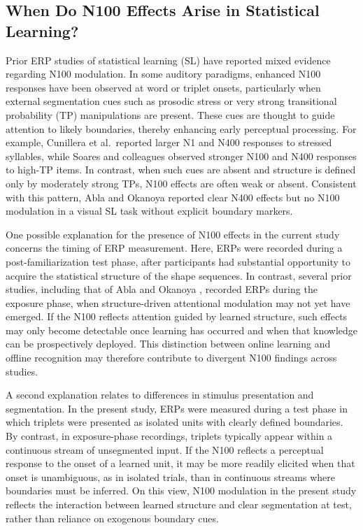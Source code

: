 \subsection*{When Do N100 Effects Arise in Statistical Learning?}

Prior ERP studies of statistical learning (SL) have reported mixed evidence regarding N100 modulation. In some auditory paradigms, enhanced N100 responses have been observed at word or triplet onsets, particularly when external segmentation cues such as prosodic stress \cite{cunilleraEffectsStressStatistical2006, sandersERPStudyContinuous2003} or very strong transitional probability (TP) manipulations \cite{soaresNotAllWords2020, soaresLearningWordsListening2022} are present. These cues are thought to guide attention to likely boundaries, thereby enhancing early perceptual processing. For example, Cunillera et al.\ reported larger N1 and N400 responses to stressed syllables, while Soares and colleagues observed stronger N100 and N400 responses to high-TP items. In contrast, when such cues are absent and structure is defined only by moderately strong TPs, N100 effects are often weak or absent. Consistent with this pattern, Abla and Okanoya \cite{ablaVisualStatisticalLearning2009} reported clear N400 effects but no N100 modulation in a visual SL task without explicit boundary markers.

One possible explanation for the presence of N100 effects in the current study concerns the timing of ERP measurement. Here, ERPs were recorded during a post-familiarization test phase, after participants had substantial opportunity to acquire the statistical structure of the shape sequences. In contrast, several prior studies, including that of Abla and Okanoya \cite{ablaVisualStatisticalLearning2009}, recorded ERPs during the exposure phase, when structure-driven attentional modulation may not yet have emerged. If the N100 reflects attention guided by learned structure, such effects may only become detectable once learning has occurred and when that knowledge can be prospectively deployed. This distinction between online learning and offline recognition may therefore contribute to divergent N100 findings across studies.

A second explanation relates to differences in stimulus presentation and segmentation. In the present study, ERPs were measured during a test phase in which triplets were presented as isolated units with clearly defined boundaries. By contrast, in exposure-phase recordings, triplets typically appear within a continuous stream of unsegmented input. If the N100 reflects a perceptual response to the onset of a learned unit, it may be more readily elicited when that onset is unambiguous, as in isolated trials, than in continuous streams where boundaries must be inferred. On this view, N100 modulation in the present study reflects the interaction between learned structure and clear segmentation at test, rather than reliance on exogenous boundary cues.

